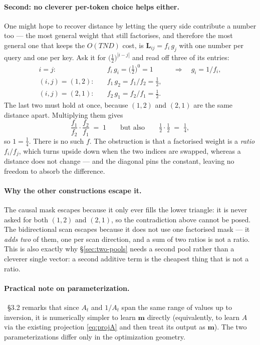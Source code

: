 \documentclass[11pt,a4paper]{article}
\begin{document}
\paragraph{Second: no cleverer per-token choice helps either.}
One might hope to recover distance by letting the query side contribute a
number too --- the most general weight that still factorises, and therefore the
most general one that keeps the $O(TND)$ cost, is
$\bm{L}_{ij}=f_i\,g_j$ with one number per query and one per key. Ask it for
$\bigl(\tfrac12\bigr)^{|i-j|}$ and read off three of its entries:
\begin{align*}
  i=j:\quad & f_i\,g_i = \bigl(\tfrac12\bigr)^0 = 1
              &&\Longrightarrow\quad g_i = 1/f_i, \\
  (i,j)=(1,2):\quad & f_1\,g_2 = f_1/f_2 = \tfrac12, \\
  (i,j)=(2,1):\quad & f_2\,g_1 = f_2/f_1 = \tfrac12 .
\end{align*}
The last two must hold at once, because $(1,2)$ and $(2,1)$ are the same
distance apart. Multiplying them gives
\begin{equation*}
  \frac{f_1}{f_2}\cdot\frac{f_2}{f_1} \;=\; 1
  \qquad\text{but also}\qquad
  \tfrac12\cdot\tfrac12 \;=\; \tfrac14,
\end{equation*}
so $1=\tfrac14$. There is no such $f$. The obstruction is that a factorised
weight is a \emph{ratio} $f_i/f_j$, which turns upside down when the two
indices are swapped, whereas a distance does not change --- and the diagonal
pins the constant, leaving no freedom to absorb the difference.

\paragraph{Why the other constructions escape it.}
The causal mask escapes because it only ever fills the lower triangle: it is
never asked for both $(1,2)$ and $(2,1)$, so the contradiction above cannot be
posed. The bidirectional scan escapes because it does not use one factorised
mask --- it \emph{adds two} of them, one per scan direction, and a sum of two
ratios is not a ratio. This is also exactly why \S\ref{sec:two-pools}
needs a second pool rather than a cleverer single vector: a second additive
term is the cheapest thing that is not a ratio.

\paragraph{Practical note on parameterization.} \cite{vssd}~\S 3.2
remarks that since $A_t$ and $1/A_t$ span the same range of values up
to inversion, it is numerically simpler to learn $\bm{m}$ directly
(equivalently, to learn $A$ via the existing projection
\eqref{eq:projA} and then treat its output as $\bm{m}$). The two
parameterizations differ only in the optimization geometry.
\end{document}

